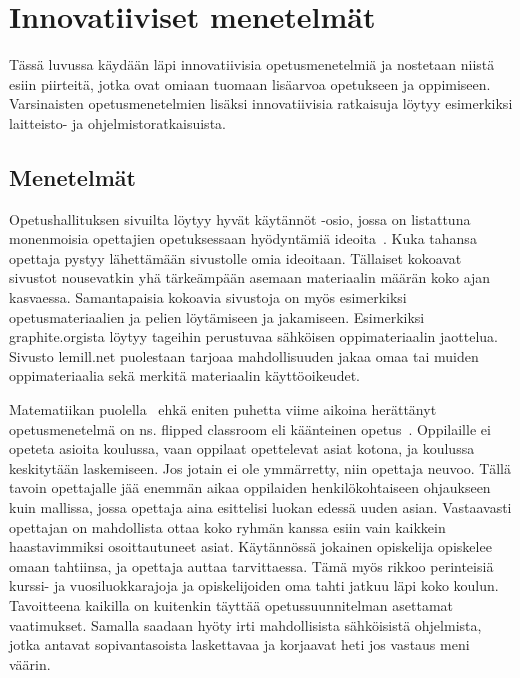 \documentclass[utf8,bachelor]{gradu3}
\begin{document}
\chapter{Innovatiiviset menetelmät}
Tässä luvussa käydään läpi innovatiivisia opetusmenetelmiä ja nostetaan niistä esiin piirteitä, jotka ovat omiaan tuomaan lisäarvoa opetukseen ja oppimiseen. Varsinaisten opetusmenetelmien lisäksi innovatiivisia ratkaisuja löytyy esimerkiksi laitteisto- ja ohjelmistoratkaisuista.

\section{Menetelmät} \label{flippedClass}
Opetushallituksen sivuilta löytyy hyvät käytännöt -osio, jossa on listattuna monenmoisia opettajien opetuksessaan hyödyntämiä ideoita~\parencite[][]{hyvatkaytannot}. Kuka tahansa opettaja pystyy lähettämään sivustolle omia ideoitaan. Tällaiset kokoavat sivustot nousevatkin yhä tärkeämpään asemaan materiaalin määrän koko ajan kasvaessa. Samantapaisia kokoavia sivustoja on myös esimerkiksi opetusmateriaalien ja pelien löytämiseen ja jakamiseen. Esimerkiksi graphite.orgista löytyy tageihin perustuvaa sähköisen oppimateriaalin jaottelua. Sivusto lemill.net puolestaan tarjoaa mahdollisuuden jakaa omaa tai muiden oppimateriaalia sekä merkitä materiaalin käyttöoikeudet.

Matematiikan puolella~\parencite[][]{maot} ehkä eniten puhetta viime aikoina herättänyt opetusmenetelmä on ns. flipped classroom eli käänteinen opetus~\parencite[][]{flipped}. Oppilaille ei opeteta asioita koulussa, vaan oppilaat opettelevat asiat kotona, ja koulussa keskitytään laskemiseen. Jos jotain ei ole ymmärretty, niin opettaja neuvoo. Tällä tavoin opettajalle jää enemmän aikaa oppilaiden henkilökohtaiseen ohjaukseen kuin mallissa, jossa opettaja aina esittelisi luokan edessä uuden asian. Vastaavasti opettajan on mahdollista ottaa koko ryhmän kanssa esiin vain kaikkein haastavimmiksi osoittautuneet asiat. Käytännössä jokainen opiskelija opiskelee omaan tahtiinsa, ja opettaja auttaa tarvittaessa. Tämä myös rikkoo perinteisiä kurssi- ja vuosiluokkarajoja ja opiskelijoiden oma tahti jatkuu läpi koko koulun. Tavoitteena kaikilla on kuitenkin täyttää opetussuunnitelman asettamat vaatimukset. Samalla saadaan hyöty irti mahdollisista sähköisistä ohjelmista, jotka antavat sopivantasoista laskettavaa ja korjaavat heti jos vastaus meni väärin.
\end{document}
